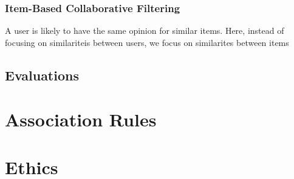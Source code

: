 \documentclass[12pt]{scrartcl}
\begin{document}
\subsubsection{Item-Based Collaborative Filtering}

\begin{note}
  A user is likely to have the same opinion for similar items. Here, instead of focusing 
  on similariteis between users, we focus on similarites between items
\end{note}

\subsection{Evaluations}

\section{Association Rules}

\section{Ethics}
\end{document}
